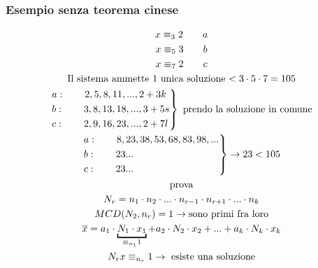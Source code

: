 \documentclass[italian]{article}
\begin{document}
\subsubsection{Esempio senza teorema cinese}
\begin{gather*}
	x \equiv_3 2 \qquad a\\
	x \equiv_5 3 \qquad b\\
	x \equiv_7 2 \qquad c\\
	\text{Il sistema ammette 1 unica soluzione $< 3\cdot5\cdot7 = 105$}\\
	\begin{rcases*}
		a: \qquad 2,5,8,11,...,2+3k\\
		b: \qquad 3,8,13,18,...,3+5s\\
		c: \qquad 2,9,16,23,...,2+7l
	\end{rcases*}
	\text{ prendo la soluzione in comune}\\
	\begin{rcases*}
	 a: \qquad 8,23,38,53,68,83,98,...\\
	 b: \qquad 23 ...\\
	 c: \qquad 23 ...
	\end{rcases*}
	\to 23 < 105\\
	\text{prova}\\
	N_r = n_1 \cdot n_2 \cdot ... \cdot n_{r-1} \cdot n_{r+1} \cdot ... \cdot n_k\\
	MCD(N_2, n_r) = 1 \to \text{sono primi fra loro}\\
	\overline{x} = a_1\cdot \underbracket{N_1 \cdot x_1}_{\equiv_{n_1} 1} + a_2\cdot N_2 \cdot x_2 + ... + a_k\cdot N_k \cdot x_k\\
	N_rx \equiv_{n_r} 1 \to \text{ esiste una soluzione} 
\end{gather*}
\end{document}
